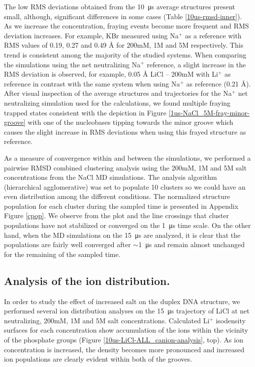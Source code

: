\documentclass[9pt,lessons]{livecoms}
\begin{document}
The low RMS deviations obtained from the \SI{10}{\micro\second}
average structures present small, although, significant differences in some
cases (Table \ref{10us-rmsd-inner}). As we increase the concentration,
fraying events become more frequent and RMS deviation increases. For
example, KBr measured using Na$^{+}$ as a reference with RMS values of
0.19, 0.27 and 0.49 Å for 200mM, 1M and 5M respectively. This trend is
consistent among the majority of the studied systems. When comparing
the simulations using the net neutralizing Na$^{+}$ reference, a
slight increase in the RMS deviation is observed, for example, 0.05 Å
LiCl – 200mM with Li$^{+}$ as reference in contrast with the same
system when using Na$^{+}$ as reference (0.21 Å). After visual
inspection of the average structures and trajectories for the Na$^{+}$
net neutralizing simulation used for the calculations, we found
multiple fraying trapped states consistent with the depiction in
Figure \ref{1us-NaCl_5M-fray-minor-groove} with one of the nucleobases
tipping towards the minor groove which causes the slight increase in
RMS deviations when using this frayed structure as reference.

As a measure of convergence within and between the simulations, we
performed a pairwise RMSD combined clustering analysis using the 200mM, 1M and
5M salt concentrations from the NaCl MD simulations. The analysis
algorithm (hierarchical agglomerative) was set to populate 10 clusters
so we could have an even distribution among the different conditions.
The normalized structure population for each cluster during the
sampled time is presented in Appendix Figure \ref{cpop}. We
observe from the plot and the line crossings that cluster populations
have not stabilized or converged on the \SI{1}{\micro\second} time
scale. On the other hand, when the MD simulations on the
\SI{15}{\micro\second} are analyzed, it is clear that the populations
are fairly well converged after $\sim$\SI{1}{\micro\second} and remain
almost unchanged for the remaining of the sampled time.

\subsection{Analysis of the ion distribution.}

In order to study the effect of increased salt on the duplex DNA
structure, we performed several ion distribution analyses on the
\SI{15}{\micro\second} trajectory of LiCl at net neutralizing, 200mM,
1M and 5M salt concentrations. Calculated Li$^{+}$ isodensity surfaces
for each concentration show accumulation of the ions within the
vicinity of the phosphate groups (Figure
\ref{10us-LiCl-ALL_canion-analysis}, top).  As ion concentration is
increased, the density becomes more pronounced and increased ion
populations are clearly evident within both of the grooves.
\end{document}
